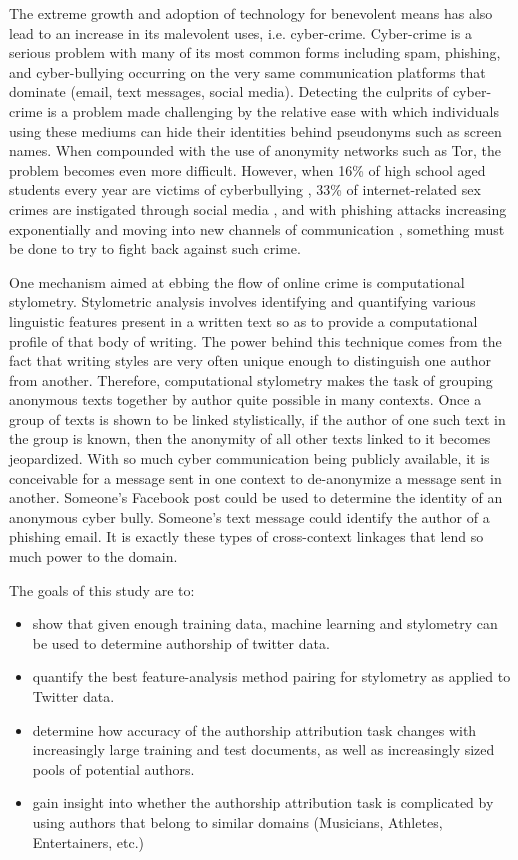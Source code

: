 \documentclass[pageno]{jpaper}
\begin{document}
The extreme growth and adoption of technology for benevolent means has also lead to an increase in its malevolent uses, i.e.  cyber-crime.  Cyber-crime is a serious problem with many of its most common forms including spam, phishing, and cyber-bullying occurring on the very same communication platforms that dominate (email, text messages, social media).  Detecting the culprits of cyber-crime is a problem made challenging by the relative ease with which individuals using these mediums can hide their identities behind pseudonyms such as screen names.  When compounded with the use of anonymity networks such as Tor, the problem becomes even more difficult.  However, when 16\% of high school aged students every year are victims of cyberbullying \cite{Cyberbullying}, 33\% of internet-related sex crimes are instigated through social media \cite{socialmedia-crime}, and with phishing attacks increasing exponentially and moving into new channels of communication \cite{phishing}, something must be done to try to fight back against such crime.

One mechanism aimed at ebbing the flow of online crime is computational stylometry.  Stylometric analysis involves identifying and quantifying various linguistic features present in a written text so as to provide a computational profile of that body of writing.  The power behind this technique comes from the fact that writing styles are very often unique enough to distinguish one author from another.  Therefore, computational stylometry makes the task of grouping anonymous texts together by author quite possible in many contexts.  Once a group of texts is shown to be linked stylistically, if the author of one such text in the group is known, then the anonymity of all other texts linked to it becomes jeopardized.  With so much cyber communication being publicly available, it is conceivable for a message sent in one context to de-anonymize a message sent in another.  Someone's Facebook post could be used to determine the identity of an anonymous cyber bully.  Someone's text message could identify the author of a phishing email.  It is exactly these types of cross-context linkages that lend so much power to the domain.

The goals of this study are to:
\begin{itemize}
\item{show that given enough training data, machine learning and stylometry can be used to determine authorship of twitter data.}
\item{quantify the best feature-analysis method pairing for stylometry as applied to Twitter data.}
\item{determine how accuracy of the authorship attribution task changes with increasingly large training and test documents, as well as increasingly sized pools of potential authors.}
\item{gain insight into whether the authorship attribution task is complicated by using authors that belong to similar domains (Musicians, Athletes, Entertainers, etc.)}
\end{itemize}
\end{document}

